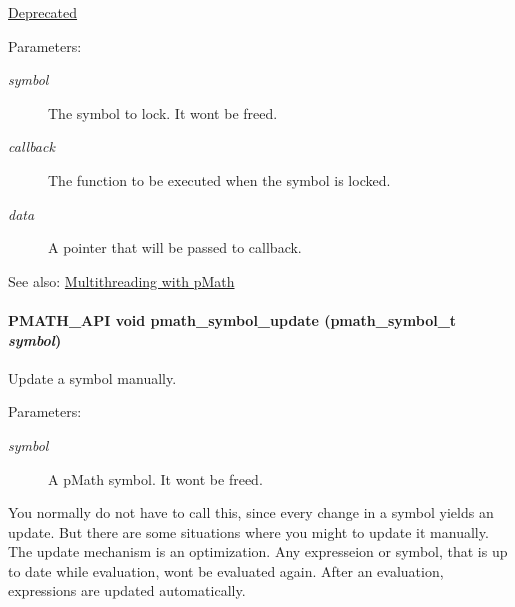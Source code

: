 \begin{Desc}
\item[\hyperlink{deprecated__deprecated000003}{Deprecated}]\end{Desc}
\begin{Desc}
\item[Parameters:]
\begin{description}
\item[{\em symbol}]The symbol to lock. It wont be freed. \item[{\em callback}]The function to be executed when the symbol is locked. \item[{\em data}]A pointer that will be passed to callback.\end{description}
\end{Desc}
\begin{Desc}
\item[See also:]\hyperlink{group__threads}{Multithreading with pMath} \end{Desc}
\hypertarget{group__symbols_g7cd56e2b77ac13a11f1b6f7fd13ba357}{
\paragraph[{pmath\_\-symbol\_\-update}]{\setlength{\rightskip}{0pt plus 5cm}PMATH\_\-API void pmath\_\-symbol\_\-update ({\bf pmath\_\-symbol\_\-t} {\em symbol})}\hfill}
\label{group__symbols_g7cd56e2b77ac13a11f1b6f7fd13ba357}


Update a symbol manually. 

\begin{Desc}
\item[Parameters:]
\begin{description}
\item[{\em symbol}]A pMath symbol. It wont be freed.\end{description}
\end{Desc}
You normally do not have to call this, since every change in a symbol yields an update. But there are some situations where you might to update it manually. The update mechanism is an optimization. Any expresseion or symbol, that is up to date while evaluation, wont be evaluated again. After an evaluation, expressions are updated automatically. 